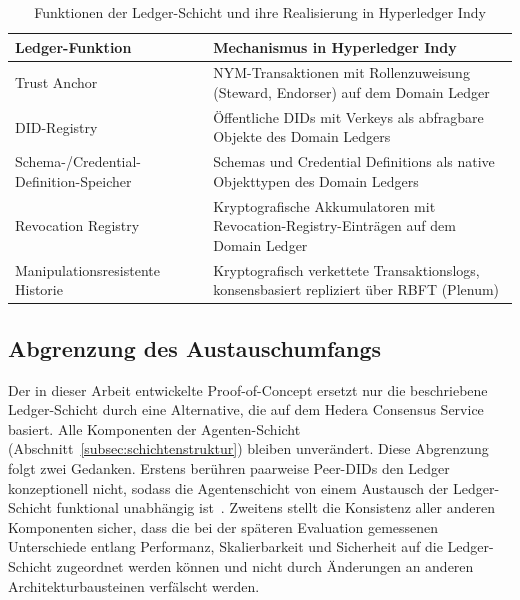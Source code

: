 \begin{table}[htbp]
\renewcommand{\arraystretch}{1.3}
  \centering
  \caption{Funktionen der Ledger-Schicht und ihre Realisierung in
  Hyperledger Indy}
  \label{tab:ledger-funktionen-indy}
  \begin{tabular}{p{} p{}}
    \toprule
    \textbf{Ledger-Funktion} & \textbf{Mechanismus in Hyperledger
    Indy} \\
    \midrule
    Trust Anchor &
    NYM-Transaktionen mit Rollenzuweisung (Steward, Endorser) auf
    dem Domain Ledger \\
    DID-Registry &
    Öffentliche DIDs mit Verkeys als abfragbare Objekte des Domain
    Ledgers \\
    Schema-/Credential-Definition-Speicher &
    Schemas und Credential Definitions als native Objekttypen des
    Domain Ledgers \\
    Revocation Registry &
    Kryptografische Akkumulatoren mit Revocation-Registry-Einträgen
    auf dem Domain Ledger \\
    Manipulationsresistente Historie &
    Kryptografisch verkettete Transaktionslogs, konsensbasiert
    repliziert über RBFT (Plenum) \\
    \bottomrule
  \end{tabular}
\end{table}

\subsection{Abgrenzung des Austauschumfangs}
\label{subsec:abgrenzung}

Der in dieser Arbeit entwickelte Proof-of-Concept ersetzt nur die beschriebene Ledger-Schicht durch eine Alternative, die auf dem Hedera Consensus Service basiert. Alle Komponenten der Agenten-Schicht (Abschnitt~\ref{subsec:schichtenstruktur}) bleiben unverändert. Diese Abgrenzung folgt zwei Gedanken. Erstens berühren paarweise Peer-DIDs den Ledger konzeptionell nicht, sodass die Agentenschicht von einem Austausch der Ledger-Schicht funktional unabhängig ist~\cite{erler2023}. Zweitens stellt die Konsistenz aller anderen Komponenten sicher, dass die bei der späteren Evaluation gemessenen Unterschiede entlang Performanz, Skalierbarkeit und Sicherheit auf die Ledger-Schicht zugeordnet werden können und nicht durch Änderungen an anderen Architekturbausteinen verfälscht werden.

